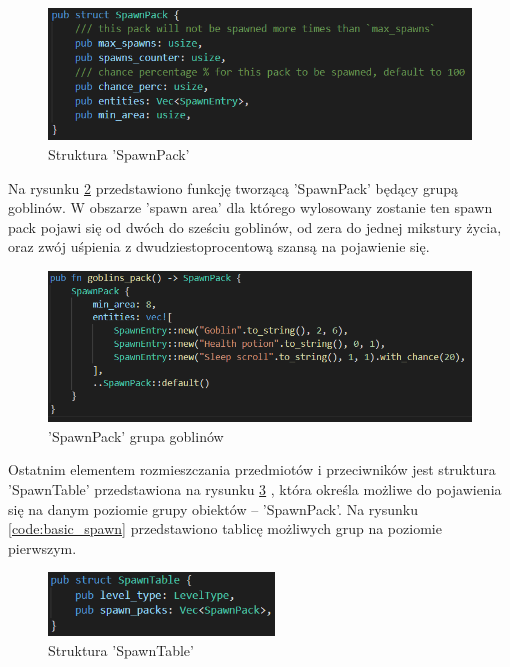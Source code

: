 \documentclass[12pt,twoside]{article}
\begin{document}
\FloatBarrier
\begin{figure}[h]
	\centering
	\includegraphics[width=16cm]{images/code/spawn_pack.png}
	\caption{Struktura 'SpawnPack'}
	\label{code:spawn_pack}
\end{figure}
\FloatBarrier

Na rysunku \ref{code:goblins_pack} przedstawiono funkcję tworzącą 'SpawnPack' będący grupą goblinów. W obszarze 'spawn area' dla którego wylosowany zostanie ten spawn pack pojawi się od dwóch do sześciu goblinów, od zera do jednej mikstury życia, oraz zwój uśpienia z dwudziestoprocentową szansą na pojawienie się.

\FloatBarrier
\begin{figure}[h]
	\centering
	\includegraphics[width=16cm]{images/code/goblins_pack.png}
	\caption{'SpawnPack' grupa goblinów}
	\label{code:goblins_pack}
\end{figure}
\FloatBarrier

Ostatnim elementem rozmieszczania przedmiotów i przeciwników jest struktura 'SpawnTable' przedstawiona na rysunku \ref{code:spawn_table} , która określa możliwe do pojawienia się na danym poziomie grupy obiektów -- 'SpawnPack'. Na rysunku \ref{code:basic_spawn} przedstawiono tablicę możliwych grup na poziomie pierwszym.

\FloatBarrier
\begin{figure}[h]
	\centering
	\includegraphics[width=6cm]{images/code/spawn_table.png}
	\caption{Struktura 'SpawnTable'}
	\label{code:spawn_table}
\end{figure}
\FloatBarrier
\end{document}

